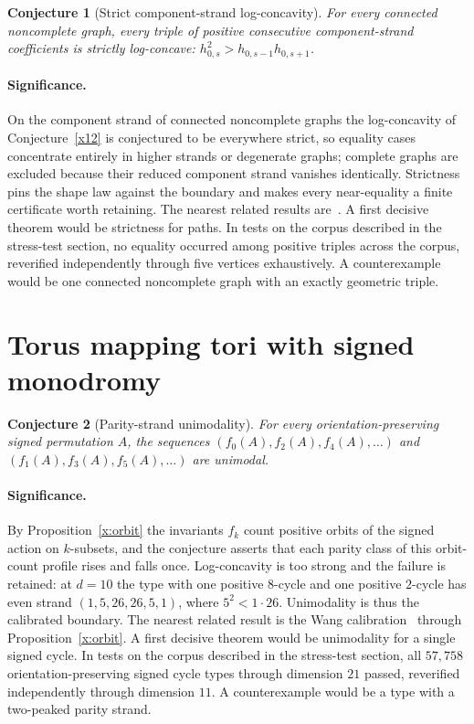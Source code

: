 \documentclass[11pt]{article}
\newtheorem{conjecture}{Conjecture}
\theoremstyle{definition}
\begin{document}
\begin{conjecture}[Strict component-strand log-concavity]\label{x15}
For every connected noncomplete graph, every triple of positive consecutive component-strand coefficients is strictly log-concave: $h_{0,s}^2>h_{0,s-1}h_{0,s+1}$.
\end{conjecture}

\paragraph{Significance.}
On the component strand of connected noncomplete graphs the log-concavity of Conjecture~\ref{x12} is conjectured to be everywhere strict, so equality cases concentrate entirely in higher strands or degenerate graphs; complete graphs are excluded because their reduced component strand vanishes identically.  Strictness pins the shape law against the boundary and makes every near-equality a finite certificate worth retaining.  The nearest related results are~\cite{Hoch77,BP15}.  A first decisive theorem would be strictness for paths.  In tests on the corpus described in the stress-test section, no equality occurred among positive triples across the corpus, reverified independently through five vertices exhaustively.  A counterexample would be one connected noncomplete graph with an exactly geometric triple.

\section{Torus mapping tori with signed monodromy}

\begin{conjecture}[Parity-strand unimodality]\label{x16}
For every orientation-preserving signed permutation $A$, the sequences $(f_0(A),f_2(A),f_4(A),\ldots)$ and $(f_1(A),f_3(A),f_5(A),\ldots)$ are unimodal.
\end{conjecture}

\paragraph{Significance.}
By Proposition~\ref{x:orbit} the invariants $f_k$ count positive orbits of the signed action on $k$-subsets, and the conjecture asserts that each parity class of this orbit-count profile rises and falls once.  Log-concavity is too strong and the failure is retained: at $d=10$ the type with one positive $8$-cycle and one positive $2$-cycle has even strand $(1,5,26,26,5,1)$, where $5^2<1\cdot26$.  Unimodality is thus the calibrated boundary.  The nearest related result is the Wang calibration~\cite{Mil68} through Proposition~\ref{x:orbit}.  A first decisive theorem would be unimodality for a single signed cycle.  In tests on the corpus described in the stress-test section, all $57{,}758$ orientation-preserving signed cycle types through dimension $21$ passed, reverified independently through dimension $11$.  A counterexample would be a type with a two-peaked parity strand.
\end{document}
